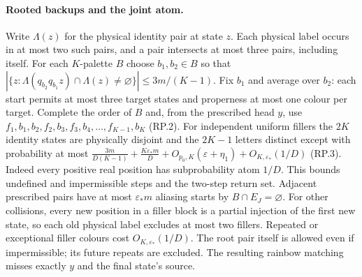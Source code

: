 \paragraph{Rooted backups and the joint atom.}
Write $\Lambda(z)$ for the physical identity pair at state $z$. Each physical label occurs in at most two such pairs, and a pair
intersects at most three pairs, including itself.  For each $K$-palette $B$ choose $b_1,b_2\in{}B$ so that $|\{z:\Lambda(q_{b_2}q_{b_1}z)\cap\Lambda(z)\ne\varnothing\}|\le3m/(K-1)$. Fix $b_1$ and average over $b_2$: each start permits at most three target states and properness at most one colour per target.
Complete the order of $B$ and, from the prescribed head $y$, use $f_1,b_1,b_2,f_2,b_3,f_3,b_4,\ldots,f_{K-1},b_K$ \textup{(RP.2)}. For independent uniform fillers the $2K$ identity states are physically disjoint and the $2K-1$ letters distinct except with probability at most $\frac{3m}{D(K-1)}+\frac{K\varepsilon_*m}{D}+O_{p_0,K}(\varepsilon+\eta_1)+O_{K,\varepsilon_*}(1/D)$ \textup{(RP.3)}. Indeed every positive real position has subprobability atom $1/D$. This bounds undefined and impermissible steps and the two-step
return set.  Adjacent prescribed pairs have at most $\varepsilon_*m$ aliasing starts by $B\cap{}E_J=\varnothing$. For other collisions, every new position in a filler block is a
partial injection of the first new state, so each old physical
label excludes at most two fillers.  Repeated or exceptional filler
colours cost $O_{K,\varepsilon_*}(1/D)$.  The root pair itself is allowed even if impermissible; its future repeats are excluded.
The resulting rainbow matching misses exactly $y$ and the final state's source.

